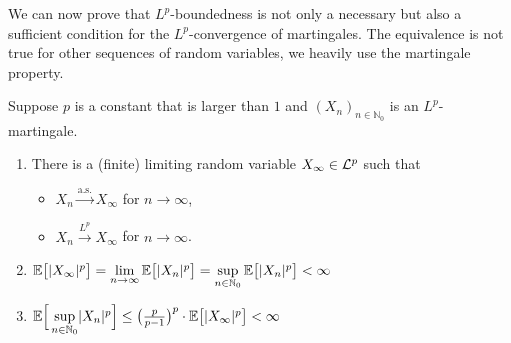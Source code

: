 We can now prove that $L^p$-boundedness is not only a necessary but also a sufficient condition for the $L^p$-convergence of martingales. The equivalence is not true for other sequences of random variables, we heavily use the martingale property.
\begin{lsuperwichtigersatz}
\begin{theorem}
Suppose $p$ is a constant that is \underline{} larger than $1$ and $(X_n)_{n\in\mathbb{N}_0}$ is an $L^p$-martingale. 
	\begin{enumerate}[label=(\roman*)]
		\item There is a (finite) limiting random variable $X_{\infty}\in \mathcal{L}^p$ such that
		\begin{itemize}
			\item $X_n \overset{\text{a.s.}}{\longrightarrow} X_{\infty}$ for $n \to \infty$,
			\item $X_n \overset{L^p}{\longrightarrow}X_{\infty}$ for $n \to \infty$.
		\end{itemize}
			\item $\mathbb{E}\big[\lvert X_{\infty}\rvert^p\big] = \lim\limits_{n\to \infty}\mathbb{E}\big[\lvert X_n \rvert^p\big] = \sup\limits_{n\in\mathbb{N}_0} \mathbb{E}\big[\lvert X_n \rvert^p\big] < \infty$
			\item $\mathbb{E}\Big[\sup\limits_{n\in\mathbb{N}_0}\lvert X_n \rvert^p\Big] \leq \big(\frac{p}{p-1}\big)^p \cdot \mathbb{E}\big[\lvert X_{\infty}\rvert^p\big] < \infty$
	\end{enumerate}	
\end{theorem}
\end{lsuperwichtigersatz}

